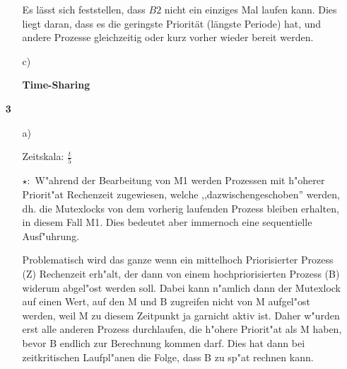 \documentclass[a4paper,11pt]{article}
\begin{document}
\begin{enumerate}
\begin{itemize}
        \begin{figure}[h]
            \center
            \scalebox{0.5}{}
        \end{figure}

        Es lässt sich feststellen, dass $B2$ nicht ein einziges Mal
        laufen kann. Dies liegt daran, dass es die geringste Priorität (längste
        Periode) hat, und andere Prozesse gleichzeitig oder kurz vorher wieder
        bereit werden.

    \item[c)]

        \textbf{Time-Sharing}

        \begin{center}
            \scalebox{0.5}{}
        \end{center}

\end{itemize}

\item[\textbf{3}]

\begin{itemize}
    \item[a)]

        Zeitskala: $\frac{t}{5}$

        \begin{figure}[h]
            \center
            \scalebox{0.4}{}
        \end{figure}

        $\star :$ W"ahrend der Bearbeitung von M1 werden Prozessen mit h"oherer Priorit"at Rechenzeit zugewiesen, welche ,,dazwischengeschoben'' werden, dh. die Mutexlocks von dem vorherig laufenden Prozess bleiben erhalten, in diesem Fall M1. Dies bedeutet aber immernoch eine sequentielle Ausf"uhrung.

        Problematisch wird das ganze wenn ein mittelhoch Priorisierter Prozess (Z) Rechenzeit erh"alt, der dann von einem hochpriorisierten Prozess (B) widerum abgel"ost werden soll. Dabei kann n"amlich dann der Mutexlock auf einen Wert, auf den M und B zugreifen nicht von M aufgel"ost werden, weil M zu diesem Zeitpunkt ja garnicht aktiv ist.
        Daher w"urden erst alle anderen Prozess durchlaufen, die h"ohere Priorit"at als M haben, bevor B endlich zur Berechnung kommen darf. Dies hat dann bei zeitkritischen Laufpl"anen die Folge, dass B zu sp"at rechnen kann.
    \end{itemize}

\end{enumerate}
\end{document}
